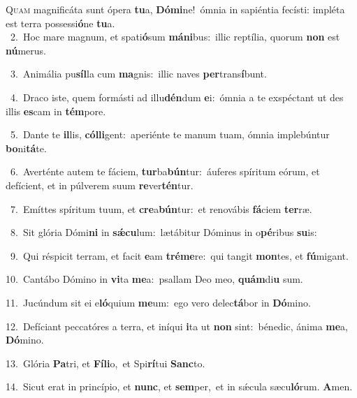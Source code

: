 \lettrine{\initial\textcolor{\initialcolor}{Q}}{uam} magnificáta sunt ópera \textbf{tu}\-a, \textbf{Dó}\-\textbf{mi}ne!~\star ómnia in sapiéntia fecísti: impléta est terra possessi\-\textbf{ó}\-ne \textbf{tu}\-a.\\
{\numbfont\textcolor{\numbcolor}{~2.}}~Hoc mare magnum, et spati\-\textbf{ó}\-sum \textbf{má}\-\textbf{ni}bus:~\star illic reptília, quorum \textbf{non} est \textbf{nú}\-merus.\par
{\numbfont\textcolor{\numbcolor}{~3.}}~Animália pu\-\textbf{síl}\-la cum \textbf{ma}\-gnis:~\star illic naves \textbf{per}\-trans\-\textbf{í}\-bunt.\par
{\numbfont\textcolor{\numbcolor}{~4.}}~Draco iste, quem formásti ad illu\-\textbf{dén}\-dum \textbf{e}\-i:~\star ómnia a te exspéctant ut des illis \textbf{es}\-cam in \textbf{tém}\-pore.\par
{\numbfont\textcolor{\numbcolor}{~5.}}~Dante te \textbf{il}\-lis, \textbf{cól}\-\textbf{li}gent:~\star aperiénte te manum tuam, ómnia implebúntur \textbf{bo}\-ni\-\textbf{tá}\-te.\par
{\numbfont\textcolor{\numbcolor}{~6.}}~Averténte autem te fáciem, \textbf{tur}\-ba\-\textbf{bún}\-tur:~\star áuferes spíritum eórum, et defícient, et in púlverem suum \textbf{re}\-ver\-\textbf{tén}\-tur.\par
{\numbfont\textcolor{\numbcolor}{~7.}}~Emíttes spíritum tuum, et \textbf{cre}\-a\-\textbf{bún}\-tur:~\star et renovábis \textbf{fá}\-ciem \textbf{ter}\-ræ.\par
{\numbfont\textcolor{\numbcolor}{~8.}}~Sit glória Dómi\textbf{ni} in \textbf{sǽ}\-\textbf{cu}lum:~\star lætábitur Dóminus in o\-\textbf{pé}\-ribus \textbf{su}\-is:\par
{\numbfont\textcolor{\numbcolor}{~9.}}~Qui réspicit terram, et facit \textbf{e}\-am \textbf{tré}\-\textbf{me}re:~\star qui tangit \textbf{mon}\-tes, et \textbf{fú}\-migant.\par
{\numbfont\textcolor{\numbcolor}{10.}}~Cantábo Dómino in \textbf{vi}\-ta \textbf{me}\-a:~\star psallam Deo meo, \textbf{quám}\-di\textbf{u} sum.\par
{\numbfont\textcolor{\numbcolor}{11.}}~Jucúndum sit ei e\-\textbf{ló}\-quium \textbf{me}\-um:~\star ego vero delec\-\textbf{tá}\-bor in \textbf{Dó}\-mino.\par
{\numbfont\textcolor{\numbcolor}{12.}}~Defíciant peccatóres a terra, et iníqui \textbf{i}\-ta ut \textbf{non} sint:~\star bénedic, ánima \textbf{me}\-a, \textbf{Dó}\-mino.\par
{\numbfont\textcolor{\numbcolor}{13.}}~Glória \textbf{Pa}\-tri, et \textbf{Fí}\-\textbf{li}o,~\star et Spi\-\textbf{rí}\-tui \textbf{Sanc}\-to.\par
{\numbfont\textcolor{\numbcolor}{14.}}~Sicut erat in princípio, et \textbf{nunc}\-, et \textbf{sem}\-per,~\star et in sǽcula sæcu\-\textbf{ló}\-rum. \textbf{A}\-men.\par
